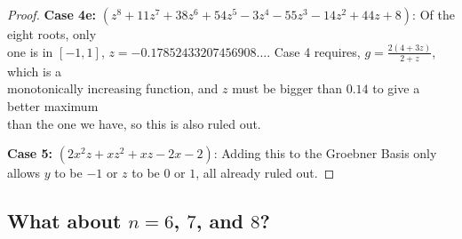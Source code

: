 \documentclass[reqno]{amsart}
\numberwithin{equation}{section}
\begin{document}
\begin{proof}
\noindent\phantom{.}\hspace{1.3 cm}\textbf{Case 4e:} $(z^8+11 z^7+38 z^6+54 z^5-3 z^4-55 z^3-14 z^2+44 z+8)$: Of the eight roots, only \\ \noindent\phantom{.}\hspace{1.2 cm} one is in $[-1,1]$,
$z = -0.17852433207456908\ldots$.  Case 4 requires, $g= \frac{2(4+3z)}{2+z}$, which is a \\\noindent\phantom{.}\hspace{1.3 cm} monotonically increasing function, and $z$ must be bigger than $0.14$ to give a better maximum \\ \noindent\phantom{.}\hspace{1.3 cm} than the one we have, so this is also ruled out.

\noindent
\textbf{Case 5:} $(2x^2z+xz^2+xz-2x-2)$:
Adding this to the Groebner Basis only allows $y$ to be $-1$ or $z$ to \noindent\phantom{.}\hspace{1.3 cm}be $0$ or $1$, all already ruled out.
\end{proof}

\subsection{What about $n =6$, $7$, and $8$?}\label{sub:678}
\end{document}
